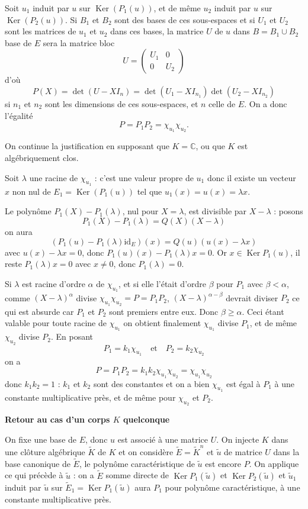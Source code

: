 Soit $u_1$ induit par $u$ sur $\operatorname{Ker}(P_1(u))$, et de même $u_2$ induit par $u$ sur $\operatorname{Ker}(P_2(u))$. Si $B_1$ et $B_2$ sont des bases de ces sous-espaces et si $U_1$ et $U_2$ sont les matrices de $u_1$ et $u_2$ dans ces bases, la matrice $U$ de $u$ dans $B=B_1\cup B_2$ base de $E$ sera la matrice bloc
\[
U=\begin{pmatrix}U_1&0\\0&U_2\end{pmatrix}
\]
d'où
\[
P(X)=\det(U-XI_n)
=\det(U_1-XI_{n_1})\det(U_2-XI_{n_2})
\]
si $n_1$ et $n_2$ sont les dimensions de ces sous-espaces, et $n$ celle de $E$.
On a donc l'égalité
\[
P=P_1P_2=\chi_{u_1}\chi_{u_2}.
\]

On continue la justification en supposant que $K=\mathbb C$, ou que $K$ est algébriquement clos.

Soit $\lambda$ une racine de $\chi_{u_1}$ : c'est une valeur propre de $u_1$ donc il existe un vecteur $x$ non nul de $E_1=\operatorname{Ker}(P_1(u))$ tel que $u_1(x)=u(x)=\lambda x$.

Le polynôme $P_1(X)-P_1(\lambda)$, nul pour $X=\lambda$, est divisible par $X-\lambda$ : posons
\[
P_1(X)-P_1(\lambda)=Q(X)(X-\lambda)
\]
on aura
\[
(P_1(u)-P_1(\lambda)\mathrm{id}_E)(x)=Q(u)(u(x)-\lambda x)
\]
avec $u(x)-\lambda x=0$, donc $P_1(u)(x)-P_1(\lambda)x=0$. Or $x\in\operatorname{Ker}P_1(u)$, il reste $P_1(\lambda)x=0$ avec $x\ne0$, donc $P_1(\lambda)=0$.

Si $\lambda$ est racine d'ordre $\alpha$ de $\chi_{u_1}$, et si elle l'était d'ordre $\beta$ pour $P_1$ avec $\beta<\alpha$, comme $(X-\lambda)^\alpha$ divise $\chi_{u_1}\chi_{u_2}=P=P_1P_2$, $(X-\lambda)^{\alpha-\beta}$ devrait diviser $P_2$ ce qui est absurde car $P_1$ et $P_2$ sont premiers entre eux. Donc $\beta\ge\alpha$. Ceci étant valable pour toute racine de $\chi_{u_1}$ on obtient finalement $\chi_{u_1}$ divise $P_1$, et de même $\chi_{u_2}$ divise $P_2$. En posant
\[
P_1=k_1\chi_{u_1}\quad\text{et}\quad P_2=k_2\chi_{u_2}
\]
on a
\[
P=P_1P_2=k_1k_2\chi_{u_1}\chi_{u_2}=\chi_{u_1}\chi_{u_2}
\]
donc $k_1k_2=1$ : $k_1$ et $k_2$ sont des constantes et on a bien $\chi_{u_1}$ est égal à $P_1$ à une constante multiplicative près, et de même pour $\chi_{u_2}$ et $P_2$.

\medskip\noindent\textbf{Retour au cas d'un corps $K$ quelconque}

On fixe une base de $E$, donc $u$ est associé à une matrice $U$. On injecte $K$ dans une clôture algébrique $\widetilde K$ de $K$ et on considère $\widetilde E=\widetilde K^n$ et $\widetilde u$ de matrice $U$ dans la base canonique de $\widetilde E$, le polynôme caractéristique de $\widetilde u$ est encore $P$. On applique ce qui précède à $\widetilde u$ : on a $\widetilde E$ somme directe de $\operatorname{Ker}P_1(\widetilde u)$ et $\operatorname{Ker}P_2(\widetilde u)$ et $\widetilde u_1$ induit par $\widetilde u$ sur $\widetilde E_1=\operatorname{Ker}P_1(\widetilde u)$ aura $P_1$ pour polynôme caractéristique, à une constante multiplicative près.

